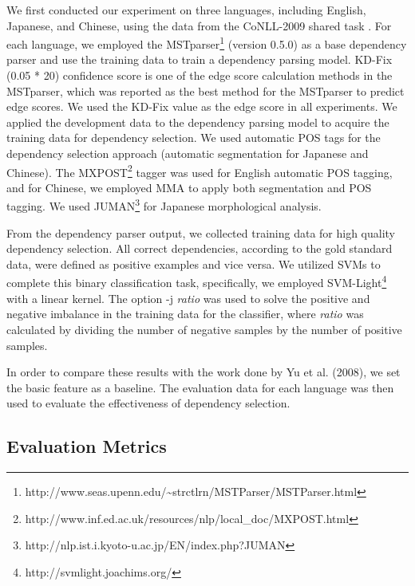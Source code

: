 \documentclass[english]{jnlp_1.4}
\begin{document}
We first conducted our experiment on three languages, including English, Japanese, and Chinese, using the data from the CoNLL-2009 shared task \cite{hajivc-EtAl:2009:CoNLL-2009-ST}.
For each language, we employed the MSTparser\footnote{http://www.seas.upenn.edu/{\textasciitilde}strctlrn/MSTParser/MSTParser.html} (version 0.5.0)
as a base dependency parser and use the training data to train a dependency parsing model. 
KD-Fix (0.05 * 20) confidence score \cite{KDFix} is one of the edge score calculation methods in the MSTparser,
which was reported as the best method for the MSTparser to predict edge scores. We used the KD-Fix value as the edge score in all experiments.
We applied the development data to the dependency parsing
model to acquire the training data for dependency selection.
We used automatic POS tags for the dependency selection approach (automatic segmentation for Japanese and Chinese).
The MXPOST\footnote{http://www.inf.ed.ac.uk/resources/nlp/local\_doc/MXPOST.html}
tagger was used for English automatic POS tagging, and for 
Chinese, we employed MMA \cite{Kruengkrai:2009}
to apply both segmentation and POS tagging.
We used JUMAN\footnote{http://nlp.ist.i.kyoto-u.ac.jp/EN/index.php?JUMAN}
for Japanese morphological analysis.

From the dependency parser output, we collected training data for
high quality dependency selection. All correct dependencies,
according to the gold standard data, were defined as positive examples and vice
versa. We utilized SVMs to complete this binary classification task, specifically,
we employed SVM-Light\footnote{http://svmlight.joachims.org/} with a linear kernel.
The option -j {\it ratio} was used to solve the positive and negative imbalance in the training data for the classifier, where
{\it ratio} was calculated by dividing the number of negative samples by the number of positive samples.

In order to compare these results with the work done by Yu et al. (2008), we set the basic feature as
a baseline. The evaluation data for each language was then used to evaluate the effectiveness of dependency selection.


\subsection{Evaluation Metrics}
\end{document}
